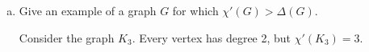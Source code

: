 \documentclass{article}
\begin{document}
\begin{itemize}
\begin{enumerate}[(a)]
			\item Give an example of a graph $G$ for which $\chi'(G)>\Delta(G).$
				\begin{soln}
					Consider the graph $K_3.$ Every vertex has degree 2, but $\chi'(K_3)=3.$
				\end{soln}

		\end{enumerate}

\end{itemize}
\end{document}
